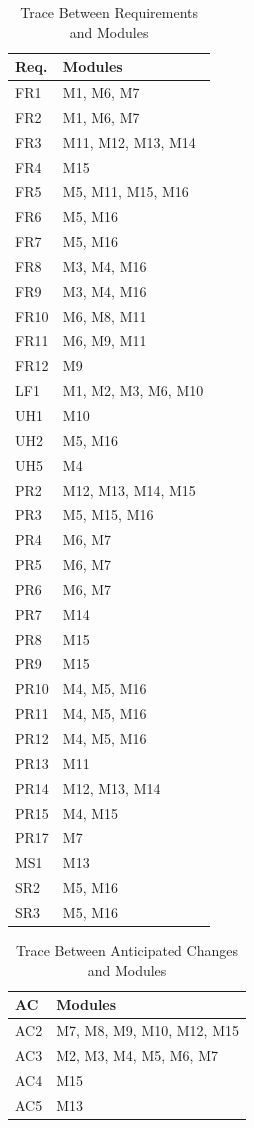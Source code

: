 \documentclass[12pt, titlepage]{article}
\begin{document}
\begin{table}[H]
\centering
\begin{tabular}{p{} p{}}
\toprule
\textbf{Req.} & \textbf{Modules}\\
\midrule
FR1 & M1, M6, M7\\
FR2 & M1, M6, M7\\
FR3 & M11, M12, M13, M14\\
FR4 & M15\\
FR5 & M5, M11, M15, M16\\
FR6 & M5, M16\\
FR7 & M5, M16\\
FR8 & M3, M4, M16 \\
FR9 & M3, M4, M16 \\
FR10 & M6, M8, M11\\
FR11 & M6, M9, M11 \\
FR12 & M9\\
LF1 & M1, M2, M3, M6, M10\\
UH1 & M10\\
UH2 & M5, M16\\
UH5 & M4\\
PR2 & M12, M13, M14, M15\\
PR3 & M5, M15, M16\\
PR4 & M6, M7\\
PR5 & M6, M7\\
PR6 & M6, M7\\
PR7 & M14\\
PR8 & M15\\
PR9 & M15\\
PR10 & M4, M5, M16\\
PR11 & M4, M5, M16\\
PR12 & M4, M5, M16\\
PR13 & M11\\
PR14 & M12, M13, M14\\
PR15 & M4, M15\\
PR17 & M7\\
MS1 & M13\\
SR2 & M5, M16\\
SR3 & M5, M16\\


\bottomrule
\end{tabular}
\caption{Trace Between Requirements and Modules}
\label{TblRT}
\end{table}

\begin{table}[H]
\centering
\begin{tabular}{p{} p{}}
\toprule
\textbf{AC} & \textbf{Modules}\\
\midrule
AC2 &  M7, M8, M9, M10, M12, M15\\
AC3 & M2, M3, M4, M5, M6, M7\\
AC4 & M15\\
AC5 & M13\\
\bottomrule
\end{tabular}
\caption{Trace Between Anticipated Changes and Modules}
\label{TblACT}
\end{table}
\end{document}
